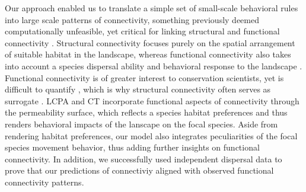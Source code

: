 \documentclass[abstract=on,10pt,a4paper,bibliography=totocnumbered]{article}
\begin{document}

Our approach enabled us to translate a simple set of small-scale behavioral
rules into large scale patterns of connectivity, something previously deemed
computationally unfeasible, yet critical for linking structural and functional
connectivity \citep{Doerr.2011}. Structural connectivity focuses purely on the
spatial arrangement of suitable habitat in the landscape, whereas functional
connectivity also takes into account a species dispersal ability and behavioral
response to the landscape \citep{Tischendorf.2000}. Functional connectivity is
of greater interest to conservation scientists, yet is difficult to quantify
\citep{Baguette.2013}, which is why structural connectivity often serves as
surrogate \citep{Doerr.2011, Fattebert.2015}. LCPA and CT incorporate functional
aspects of connectivity through the permeability surface, which reflects a
species habitat preferences and thus renders behavioral impacts of the lanscape
on the focal species. Aside from rendering habitat preferences, our model also
integrates peculiarities of the focal species movement behavior, thus adding
further insights on functional connectivity. In addition, we successfully used
independent dispersal data to prove that our predictions of connectiviy aligned
with observed functional connectivity patterns.
\end{document}
